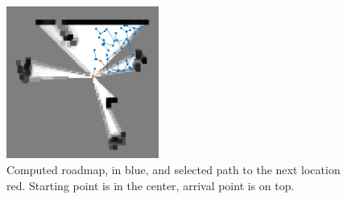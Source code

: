 \documentclass[twocolumn, a4paper]{article}
\begin{document}
\newpage
\begin{figure}[h]
    \centering
    \includegraphics[width=5cm]{"../Report_images/Roadmap.png"}
    \caption{Computed roadmap, in blue, and selected path to the next location
             red. Starting point is in the center, arrival point is on top.}
    \label{fig:Roadmap_ex}
\end{figure}
\end{document}
